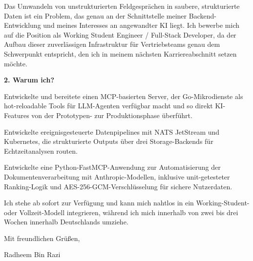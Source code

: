 \documentclass[11pt,a4paper]{coverletter}
\begin{document}
Das Umwandeln von unstrukturierten Feldgesprächen in saubere, strukturierte Daten ist ein Problem, das genau an der Schnittstelle meiner Backend-Entwicklung und meines Interesses an angewandter KI liegt. Ich bewerbe mich auf die Position als Working Student Engineer / Full-Stack Developer, da der Aufbau dieser zuverlässigen Infrastruktur für Vertriebsteams genau dem Schwerpunkt entspricht, den ich in meinem nächsten Karriereabschnitt setzen möchte.

\vspace{8pt}\noindent\textbf{2. Warum ich?}\par\vspace{3pt}

\bullets

  \item Entwickelte und bereitete einen MCP-basierten Server, der Go-Mikrodienste als hot-reloadable Tools für LLM-Agenten verfügbar macht und so direkt KI-Features von der Prototypen- zur Produktionsphase überführt.

  \item Entwickelte ereignisgesteuerte Datenpipelines mit NATS JetStream und Kubernetes, die strukturierte Outputs über drei Storage-Backends für Echtzeitanalysen routen.

  \item Entwickelte eine Python-FastMCP-Anwendung zur Automatisierung der Dokumentenverarbeitung mit Anthropic-Modellen, inklusive unit-getesteter Ranking-Logik und AES-256-GCM-Verschlüsselung für sichere Nutzerdaten.

\bulletsend

Ich stehe ab sofort zur Verfügung und kann mich nahtlos in ein Working-Student- oder Vollzeit-Modell integrieren, während ich mich innerhalb von zwei bis drei Wochen innerhalb Deutschlands umziehe.

\closing{Mit freundlichen Grüßen,}{Radheem Bin Razi}
\end{document}
